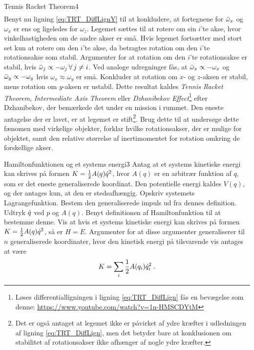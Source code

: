 \begin{opgave}{Tennis Racket Theorem}{4}
\begin{align}
\end{align}
\opg Benyt nu ligning \eqref{eq:TRT_DiffLignY} til at konkludere, at fortegnene for $\ddot{\omega}_x$ og $\omega_x$ er ens og ligeledes for $\omega_z$.
\opg Legemet sættes til at rotere om sin $i$'te akse, hvor vinkelhastigheden om de andre akser er små. Hvis legemet fortsætter med stort set kun at rotere om den $i$'te akse, da betragtes rotation om den $i$'te rotationsakse som stabil. Argumenter for at rotation om den $i$'te rotationsakse er stabil, hvis $\ddot{\omega}_j \propto - \omega_j \, \forall \, j\neq i$.
\opg Ved analoge udregninger fås, at $\ddot{\omega}_x \propto -\omega_x$ og $\ddot{\omega}_y \propto -\omega_y$ hvis $\omega_x\approx\omega_y$ er små. Konkluder at rotation om $x$- og $z$-aksen er stabil, mens rotation om $y$-aksen er ustabil. Dette resultat kaldes \textit{Tennis Racket Theorem}, \textit{Intermediate Axis Theorem} eller \textit{Dzhanibekov Effect}\footnote{Løses differentialligningen i ligning \ref{eq:TRT_DiffLign} fås en bevægelse som denne: \url{https://www.youtube.com/watch?v=1n-HMSCDYtM}} efter Dzhanibekov, der bemærkede det under en mission i rummet.
\opg Den eneste antagelse der er lavet, er at legemet er stift\footnote{Det er også antaget at legemet ikke er påvirket af ydre kræfter i udledningen af ligning \ref{eq:TRT_DiffLign}, men det betyder bare at konklusionen om stabilitet af rotationsakser ikke afhænger af nogle ydre kræfter.}. Brug dette til at undersøge dette fænomen med virkelige objekter, forklar hvilke rotationsakser, der er mulige for objektet, samt den relative størrelse af inertimomentet for rotation omkring de forskellige akser.
\end{opgave}
%
%
\begin{opgave}{Hamiltonfunktionen og et systems energi}{3} \label{opg:HamiltonEnergi}
Antag at et systems kinetiske energi kan skrives på formen $K = \frac{1}{2}A(q)\dot{q}^2$, hvor $A(q)$ er en arbitrær funktion af $q$, som er det eneste generaliserede koordinat. Den potentielle energi kaldes $V(q)$, og der antages kun, at den er stedsafhængig.
\opg Opskriv systemets Lagrangefunktion.
\opg Bestem den generaliserede impuls ud fra dennes definition.
\opg Udtryk $\dot{q}$ ved $p$ og $A(q)$.
\opg Benyt definitionen af Hamiltonfunktion til at bestemme denne.
\opg Vis at hvis et systems kinetiske energi kan skrives på formen $K = \frac{1}{2}A(q)\dot{q}^2$, så er $H = E$.
\opg Argumenter for at disse argumenter generaliserer til $n$ generaliserede koordinater, hvor den kinetisk energi på tilsvarende vis antages at være
\begin{align*}
	K = \sum_i\frac{1}{2}A(q_i)\dot{q}_i^2 \: .
\end{align*}
\end{opgave}
